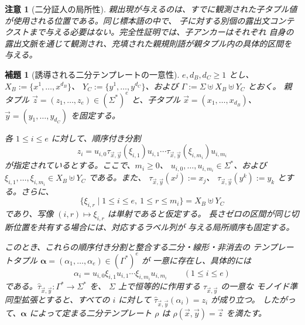 \documentclass[11pt,a4paper]{ltjsarticle}
\newtheorem{lemma}[theorem]{補題}
\newtheorem{remark}[theorem]{注意}
\theoremstyle{remark}
\newcommand{\tuple}[1]{\vec{#1}}
\begin{document}
\begin{remark}[二分証人の局所性]
\label{rem:binary-witness-locality}
親出現が与えるのは、すでに観測された子タプル値が使用される位置である。同じ標本語の中で、
子に対する別個の露出文コンテクストまで与える必要はない。完全性証明では、子アンカーはそれぞれ
自身の露出文脈を通じて観測され、充填された親規則語が親タプル内の具体的区間を与える。
\end{remark}

\begin{lemma}[誘導される二分テンプレートの一意性]
\label{lem:unique-induced-template}
\(e,d_B,d_C\ge1\) とし、
\(X_B:=\{x^1,\ldots,x^{d_B}\}\)、
\(Y_C:=\{y^1,\ldots,y^{d_C}\}\)、および
\(\Gamma:=\Sigma\uplus X_B\uplus Y_C\) とおく。
親タプル \(\tuple z=(z_1,\ldots,z_e)\in(\Sigma^*)^e\) と、子タプル
\(\tuple x=(x_1,\ldots,x_{d_B})\)、
\(\tuple y=(y_1,\ldots,y_{d_C})\) を固定する。

各 \(1\le i\le e\) に対して、順序付き分割
\[
  z_i=u_{i,0}\tau_{\tuple x,\tuple y}(\xi_{i,1})u_{i,1}\cdots
      \tau_{\tuple x,\tuple y}(\xi_{i,m_i})u_{i,m_i}
  \tag{1}
\]
が指定されているとする。ここで、\(m_i\ge0\)、
\(u_{i,0},\ldots,u_{i,m_i}\in\Sigma^*\)、および
\(\xi_{i,1},\ldots,\xi_{i,m_i}\in X_B\uplus Y_C\) である。また、
\(\tau_{\tuple x,\tuple y}(x^j):=x_j\)、
\(\tau_{\tuple x,\tuple y}(y^k):=y_k\) とする。さらに、
\[
  \{\xi_{i,r}\mid 1\le i\le e,\ 1\le r\le m_i\}=X_B\uplus Y_C
  \tag{2}
\]
であり、写像 \((i,r)\mapsto\xi_{i,r}\) は単射であると仮定する。
長さゼロの区間が同じ切断位置を共有する場合には、対応するラベル列が
与える局所順序も固定する。

このとき、これらの順序付き分割と整合する二分・線形・非消去の
テンプレートタプル
\(\boldsymbol\alpha=(\alpha_1,\ldots,\alpha_e)\in(\Gamma^*)^e\) が
一意に存在し、具体的には
\[
  \alpha_i=u_{i,0}\xi_{i,1}u_{i,1}\cdots
  \xi_{i,m_i}u_{i,m_i}\qquad(1\le i\le e)
  \tag{3}
\]
である。\(\widehat\tau_{\tuple x,\tuple y}:\Gamma^*\to\Sigma^*\) を、
\(\Sigma\) 上で恒等的に作用する \(\tau_{\tuple x,\tuple y}\) の一意な
モノイド準同型拡張とすると、すべての \(i\) に対して
\(\widehat\tau_{\tuple x,\tuple y}(\alpha_i)=z_i\) が成り立つ。
したがって、\(\boldsymbol\alpha\) によって定まる二分テンプレート \(\rho\) は
\(\rho(\tuple x,\tuple y)=\tuple z\) を満たす。
\end{lemma}
\end{document}
